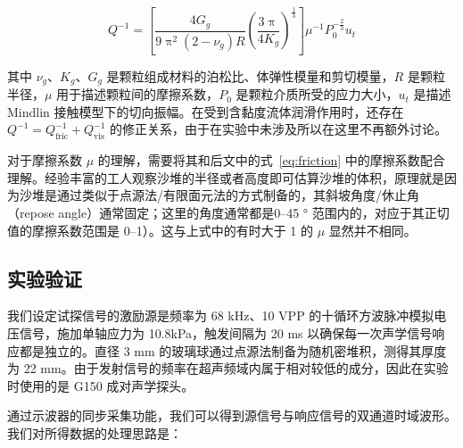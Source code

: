\begin{equation}
  Q^{-1} = \left[\frac{4G_{g}}{9\uppi^2(2-\nu_{g})R}\left(\frac{3\uppi}{4K_{g}}\right)^{\frac{1}{3}}\right]\mu^{-1}P_{0}^{-\frac{2}{3}}u_{t}
\end{equation}

其中 $\nu_{g}$、$K_{g}$、$G_{g}$ 是颗粒组成材料的泊松比、体弹性模量和剪切模量，$R$ 是颗粒半径，$\mu$ 用于描述颗粒间的摩擦系数，$P_{0}$ 是颗粒介质所受的应力大小，$u_{t}$ 是描述 Mindlin 接触模型下的切向振幅。在受到含黏度流体润滑作用时，还存在 $Q^{-1} = Q_{\text{fric}}^{-1} + Q_{\text{vis}}^{-1}$ 的修正关系，由于在实验中未涉及所以在这里不再额外讨论。

对于摩擦系数 $\mu$ 的理解，需要将其和后文中的式~\eqref{eq:friction} 中的摩擦系数配合理解。经验丰富的工人观察沙堆的半径或者高度即可估算沙堆的体积，原理就是因为沙堆是通过类似于点源法/有限面元法的方式制备的，其斜坡角度/休止角（repose angle）通常固定；这里的角度通常都是\numrange{0}{45} \unit{\degree} 范围内的，对应于其正切值的摩擦系数范围是 \numrange{0}{1}）。这与上式中的有时大于 1 的 $\mu$ 显然并不相同。

\subsection{实验验证}

我们设定试探信号的激励源是频率为 68 \unit{\kilo\hertz}、10 \unit{VPP} 的十循环方波脉冲模拟电压信号，施加单轴应力为 10.8\unit{\kilo\pascal}，触发间隔为 20 \unit{\milli\second} 以确保每一次声学信号响应都是独立的。直径 3 \unit{\milli\meter} 的玻璃球通过点源法制备为随机密堆积，测得其厚度为 22 \unit{\milli\meter}。由于发射信号的频率在超声频域内属于相对较低的成分，因此在实验时使用的是 G150 成对声学探头。

通过示波器的同步采集功能，我们可以得到源信号与响应信号的双通道时域波形。我们对所得数据的处理思路是：

